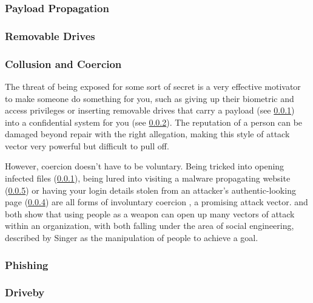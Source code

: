 \documentclass[a4paper, 11pt]{article}
\begin{document}
\subsubsection{Payload Propagation}
\label{sec:payloads}

\subsubsection{Removable Drives}
\label{sec:removabledrives}

\subsubsection{Collusion and Coercion}
\label{sec:coercion}
The threat of being exposed for some sort of secret is a very effective motivator to make someone do something for you, such as giving up their biometric and access privileges \cite{ref:biometricattackvectors} or inserting removable drives that carry a payload (see \ref{sec:payloads}) into a confidential system for you (see \ref{sec:removabledrives}). The reputation of a person can be damaged beyond repair with the right allegation, making this style of attack vector very powerful but difficult to pull off.

However, coercion doesn't have to be voluntary. Being tricked into opening infected files (\ref{sec:payloads}), being lured into visiting a malware propagating website (\ref{sec:driveby}) or having your login details stolen from an attacker's authentic-looking page (\ref{sec:phishing}) are all forms of involuntary coercion \cite{ref:jang2014survey,ref:singer2014cybersecurity}, a promising attack vector. \cite{ref:biometricattackvectors} and \cite{ref:jang2014survey} both show that using people as a weapon can open up many vectors of attack within an organization, with both falling under the area of social engineering, described by Singer \cite{ref:singer2014cybersecurity} as the manipulation of people to achieve a goal.

\subsubsection{Phishing}
\label{sec:phishing}


\subsubsection{Driveby}
\label{sec:driveby}
\end{document}
